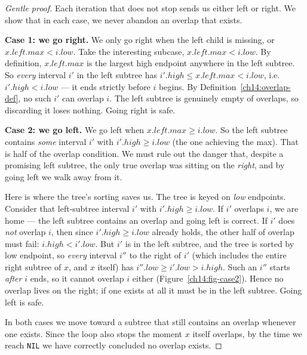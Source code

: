 \begin{proof}[Gentle proof]
Each iteration that does not stop sends us either left or right. We show that in
each case, we never abandon an overlap that exists.

\textbf{Case 1: we go right.} We only go right when the left child is missing, or
$x.\mathit{left}.\mathit{max} < i.\mathit{low}$. Take the interesting subcase,
$x.\mathit{left}.\mathit{max} < i.\mathit{low}$. By definition,
$x.\mathit{left}.\mathit{max}$ is the largest high endpoint anywhere in the left
subtree. So \emph{every} interval $i'$ in the left subtree has
$i'.\mathit{high} \le x.\mathit{left}.\mathit{max} < i.\mathit{low}$, i.e.\
$i'.\mathit{high} < i.\mathit{low}$ --- it ends strictly before $i$ begins. By
Definition~\ref{ch14:overlap-def}, no such $i'$ can overlap $i$. The left subtree
is genuinely empty of overlaps, so discarding it loses nothing. Going right is
safe.

\textbf{Case 2: we go left.} We go left when
$x.\mathit{left}.\mathit{max} \ge i.\mathit{low}$. So the left subtree contains
\emph{some} interval $i'$ with $i'.\mathit{high} \ge i.\mathit{low}$ (the one
achieving the max). That is half of the overlap condition. We must rule out the
danger that, despite a promising left subtree, the only true overlap was sitting
on the \emph{right}, and by going left we walk away from it.

Here is where the tree's sorting saves us. The tree is keyed on \emph{low}
endpoints. Consider that left-subtree interval $i'$ with
$i'.\mathit{high} \ge i.\mathit{low}$. If $i'$ overlaps $i$, we are home --- the
left subtree contains an overlap and going left is correct. If $i'$ does
\emph{not} overlap $i$, then since $i'.\mathit{high} \ge i.\mathit{low}$ already
holds, the other half of overlap must fail:
$i.\mathit{high} < i'.\mathit{low}$. But $i'$ is in the left subtree, and the
tree is sorted by low endpoint, so \emph{every} interval $i''$ to the right of
$i'$ (which includes the entire right subtree of $x$, and $x$ itself) has
$i''.\mathit{low} \ge i'.\mathit{low} > i.\mathit{high}$. Such an $i''$ starts
\emph{after} $i$ ends, so it cannot overlap $i$ either (Figure~\ref{ch14:fig-case2}).
Hence no overlap lives on
the right; if one exists at all it must be in the left subtree. Going left is
safe.

In both cases we move toward a subtree that still contains an overlap whenever
one exists. Since the loop also stops the moment $x$ itself overlaps, by the time
we reach \texttt{NIL} we have correctly concluded no overlap exists. \qedhere
\end{proof}

